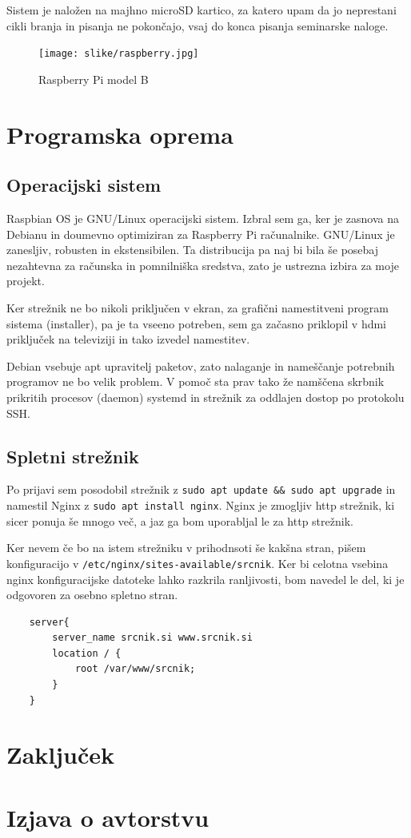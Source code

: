 \documentclass[12pt, a4paper]{article}
\begin{document}
Sistem je naložen na majhno microSD kartico, za katero upam da jo neprestani cikli branja in pisanja ne pokončajo, vsaj do konca pisanja seminarske naloge.
\begin{figure}[h]
	\centering
	\texttt{[image: slike/raspberry.jpg]}
	\caption{Raspberry Pi model B}
	\label{fig:raspberry}
\end{figure}

\section{Programska oprema}
\subsection{Operacijski sistem}
Raspbian OS je GNU/Linux operacijski sistem. Izbral sem ga, ker je zasnova na Debianu in doumevno optimiziran za Raspberry Pi računalnike.
GNU/Linux je zanesljiv, robusten in ekstensibilen.
Ta distribucija pa naj bi bila še posebaj nezahtevna za računska in pomnilniška sredstva\cite{raspbian}, zato je ustrezna izbira za moje projekt.

Ker strežnik ne bo nikoli priključen v ekran, za grafični namestitveni program sistema (installer), pa je ta vseeno potreben, sem ga začasno priklopil v hdmi priključek na televiziji in tako izvedel namestitev.

Debian vsebuje apt upravitelj paketov, zato nalaganje in nameščanje potrebnih programov ne bo velik problem.
V pomoč sta prav tako že namščena skrbnik prikritih procesov (daemon) systemd in strežnik za oddlajen dostop po protokolu SSH. 

\subsection{Spletni strežnik}
Po prijavi sem posodobil strežnik z \verb|sudo apt update && sudo apt upgrade| in namestil Nginx z \verb|sudo apt install nginx|.
Nginx je zmogljiv http strežnik, ki sicer ponuja še mnogo več, a jaz ga bom uporabljal le za http strežnik.\cite{nginx}

Ker nevem če bo na istem strežniku v prihodnsoti še kakšna stran, pišem konfiguracijo v \verb|/etc/nginx/sites-available/srcnik|.
Ker bi celotna vsebina nginx konfiguracijske datoteke lahko razkrila ranljivosti, bom navedel le del, ki je odgovoren za osebno spletno stran.
\begin{lstlisting}
	server{
		server_name srcnik.si www.srcnik.si
		location / {
			root /var/www/srcnik;
		}
	}
\end{lstlisting}

\section{Zaključek}


\section*{Izjava o avtorstvu}
\end{document}
